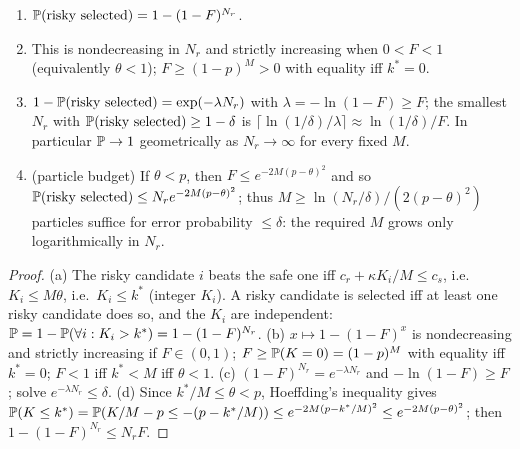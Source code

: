\begin{theorem}\label{thm:select}
\begin{enumerate}
\item[(a)] $\mathbb{P}(\text{risky selected})=1-(1-F)^{N_r}$.
\item[(b)] This is nondecreasing in $N_r$ and strictly increasing when $0<F<1$ (equivalently $\theta<1$); $F\ge(1-p)^M>0$ with equality iff $k^*=0$.
\item[(c)] $1-\mathbb{P}(\text{risky selected})=\exp(-\lambda N_r)$ with $\lambda=-\ln(1-F)\ge F$; the smallest $N_r$ with $\mathbb{P}(\text{risky selected})\ge1-\delta$ is $\lceil\ln(1/\delta)/\lambda\rceil\approx\ln(1/\delta)/F$. In particular $\mathbb{P}\to1$ geometrically as $N_r\to\infty$ for every fixed $M$.
\item[(d)] (particle budget) If $\theta<p$, then $F\le e^{-2M(p-\theta)^2}$ and so $\mathbb{P}(\text{risky selected})\le N_re^{-2M(p-\theta)^2}$; thus $M\ge\ln(N_r/\delta)/(2(p-\theta)^2)$ particles suffice for error probability $\le\delta$: the required $M$ grows only logarithmically in $N_r$.
\end{enumerate}
\end{theorem}
\begin{proof}
(a) The risky candidate $i$ beats the safe one iff $c_r+\kappa K_i/M\le c_s$, i.e.\ $K_i\le M\theta$, i.e.\ $K_i\le k^*$ (integer $K_i$).
A risky candidate is selected iff at least one risky candidate does so, and the $K_i$ are independent: $\mathbb{P}=1-\mathbb{P}(\forall i:K_i>k^*)=1-(1-F)^{N_r}$.
(b) $x\mapsto1-(1-F)^x$ is nondecreasing and strictly increasing if $F\in(0,1)$; $F\ge\mathbb{P}(K=0)=(1-p)^M$ with equality iff $k^*=0$; $F<1$ iff $k^*<M$ iff $\theta<1$.
(c) $(1-F)^{N_r}=e^{-\lambda N_r}$ and $-\ln(1-F)\ge F$; solve $e^{-\lambda N_r}\le\delta$.
(d) Since $k^*/M\le\theta<p$, Hoeffding's inequality \cite{hoeffding1963} gives $\mathbb{P}(K\le k^*)=\mathbb{P}(K/M-p\le-(p-k^*/M))\le e^{-2M(p-k^*/M)^2}\le e^{-2M(p-\theta)^2}$; then $1-(1-F)^{N_r}\le N_rF$.
\end{proof}

